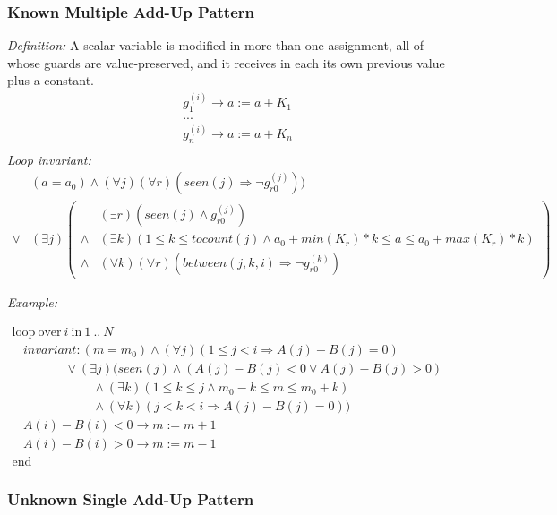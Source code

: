 \documentclass[a4paper,10pt]{article}
\newcommand{\idx}{\ensuremath{i}\xspace}
\newcommand{\at}[1]{{(#1)}}
\newcommand{\KWloop}{\ensuremath{\mathrm{loop}~}}
\newcommand{\KWend}{\ensuremath{\mathrm{end}~}}
\newcommand{\KWover}{\ensuremath{\mathrm{over}~}}
\newcommand{\KWin}{\ensuremath{~\mathrm{in}~}}
\newcommand{\impl}{\ensuremath{\Longrightarrow}}
\newcommand{\seen}[1]{\ensuremath{\mathit{seen}(#1)}\xspace}
\newcommand{\tocount}[1]{\ensuremath{\mathit{tocount}(#1)}\xspace}
\newcommand{\between}[3]{\ensuremath{\mathit{between}{(#1,#2,#3)}}\xspace}
\newcommand{\loopinvariant}{\noindent\textit{Loop invariant:}\xspace}
\newcommand{\patterndef}{\noindent\textit{Definition:}\xspace}
\newcommand{\patternexample}{\noindent\textit{Example:}\xspace}
\begin{document}
\subsubsection*{Known Multiple Add-Up Pattern}

\patterndef A scalar variable is modified in more than one assignment, all of
whose guards are value-preserved, and it receives in each its own previous value
plus a constant.
%
\begin{eqnarray*}
&g_1^\at{\idx} \rightarrow a := a + K_1\\
&...\\
&g_n^\at{\idx} \rightarrow a := a + K_n\\
\end{eqnarray*}
%
\loopinvariant
%
\begin{eqnarray*}
&(a = a_0) \land (\forall j)(\forall r)( \seen{j} \impl \neg g_{r0}^\at{j})) \\
\lor 
& (\exists j)
\left(\begin{array}{cl}
&(\exists r)(\seen{j} \land g_{r0}^\at{j}) \\
\land& (\exists k)(1 \leq k \leq \tocount{j} \land a_0 + \mathit{min}(K_r) * k \leq a \leq a_0 + \mathit{max}(K_r) * k) \\
\land& (\forall k)(\forall r)(\between{j}{k}{\idx} \impl \neg g_{r0}^\at{k})
\end{array}\right)
\end{eqnarray*}

\bigskip
\patternexample

\medskip
$\begin{array}{l}
  \KWloop \KWover i \KWin 1~..~N \\
  ~~~~ \textit{invariant}: (m = m_0) \land (\forall j)(1\leq j < i \impl A(j)-B(j) = 0)\\
  ~~~~~~~~~~~~~~~~~~~ \lor (\exists j)(\seen{j} \land (A(j)-B(j) < 0 \lor A(j)-B(j) > 0) \\
  ~~~~~~~~~~~~~~~~~~~~~~~~~~~~~ \land (\exists k)(1 \leq k \leq j \land m_0-k \leq m \leq m_0 +k) \\
  ~~~~~~~~~~~~~~~~~~~~~~~~~~~~~ \land (\forall k)(j < k < i \impl A(j)-B(j) = 0))\\
  ~~~~ A(i)-B(i) < 0 \rightarrow m := m+1\\
  ~~~~ A(i)-B(i) > 0 \rightarrow m := m-1\\
  \KWend
\end{array}$

\subsubsection*{Unknown Single Add-Up Pattern}
\end{document}
